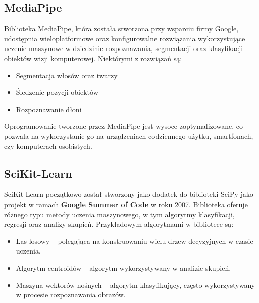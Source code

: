 \subsection{MediaPipe}

\quad Biblioteka MediaPipe, która została stworzona przy wsparciu firmy Google, udostępnia wieloplatformowe oraz konfigurowalne rozwiązania wykorzystujące uczenie maszynowe w dziedzinie rozpoznawania, segmentacji oraz klasyfikacji obiektów wizji komputerowej. Niektórymi z rozwiązań są:

\begin{itemize}
    \item Segmentacja włosów oraz twarzy
    \item Śledzenie pozycji obiektów
    \item Rozpoznawanie dłoni
\end{itemize}

\quad Oprogramowanie tworzone przez MediaPipe jest wysoce zoptymalizowane, co pozwala na wykorzystanie go na urządzeniach codziennego użytku, smartfonach, czy komputerach osobistych. 


\subsection{SciKit-Learn}

\quad SciKit-Learn początkowo został stworzony jako dodatek do biblioteki SciPy jako projekt w ramach \textbf{Google Summer of Code} w roku 2007. Biblioteka oferuje różnego typu metody uczenia maszynowego, w tym algorytmy klasyfikacji, regresji oraz analizy skupień. Przykładowym algorytmami w bibliotece są:
\begin{itemize}
    \item Las losowy -- polegająca na konstruowaniu wielu drzew decyzyjnych w czasie uczenia. 
    \item Algorytm centroidów -- algorytm wykorzystywany w analizie skupień.
    \item Maszyna wektorów nośnych -- algorytm klasyfikujący, często wykorzystywany w procesie rozpoznawania obrazów. 
\end{itemize}